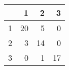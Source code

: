 \begin{tabular}{rrrr}
  \hline
 & 1 & 2 & 3 \\ 
  \hline
1 &  20 &   5 &   0 \\ 
  2 &   3 &  14 &   0 \\ 
  3 &   0 &   1 &  17 \\ 
   \hline
\end{tabular}
